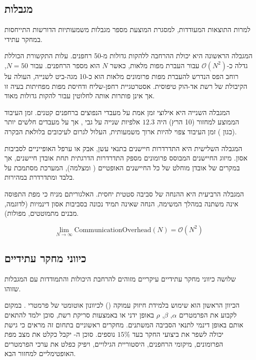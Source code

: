 \subsection{מגבלות}
\label{sec:ch09_limitations}

למרות התוצאות המעודדות, למסגרת המוצעת מספר מגבלות משמעותיות הדורשות התייחסות במחקר עתידי.

המגבלה הראשונה היא יכולת ההרחבה ללהקות גדולות מ-50 רחפנים. עלות התקשורת הכוללת גדלה כ-$\mathcal{O}(N^{2})$ עבור העברת מפות מלאות, כאשר $N$ הוא מספר הרחפנים. עבור $N = 50$, רוחב הפס הנדרש להעברת מפות פרומונים מלאות הוא כ-10 מגה-ביט לשנייה, העולה על הקיבולת של רשת  אד-הוק טיפוסית. אסטרטגיית רחפן-שליח ודחיסת מפות מפחיתות בעיה זו אך אינן פותרות אותה לחלוטין עבור להקות גדולות מאוד.

המגבלה השנייה היא אילוצי זמן אמת על מעבדי  הנפוצים ברחפנים קטנים. זמן העיבוד הממוצע למחזור  (10 הרץ) היה $12.3$ אלפיות שנייה על גבי , אך על מעבדים חלשים יותר (כגון ) זמן העיבוד צפוי להיות ארוך משמעותית, העלול לגרום לעיכובים בלולאת הבקרה.

המגבלה השלישית היא התדרדרות חיישנים בתנאי עשן, אבק או ערפל האופייניים לסביבות אסון. מיזוג החיישנים המבוסס פרומונים מספק התדרדרות הדרגתית תחת אובדן חיישנים, אך במקרים של אובדן מוחלט של כל החיישנים האופטיים ( ומצלמה), המערכת מסתמכת על  בלבד ומתדרדרת במהירות.

המגבלה הרביעית היא ההנחה של סביבה סטטית יחסית. האלגוריתם מניח כי מפת התפוסה אינה משתנה במהלך המשימה, הנחה שאינה תמיד נכונה בסביבות אסון דינמיות (לדוגמה, מבנים מתמוטטים, מפולות).

\begin{equation}
\lim_{N \to \infty} \text{CommunicationOverhead}(N) = \mathcal{O}(N^{2})
\label{eq:ch09_scalability}
\end{equation}

\subsection{כיווני מחקר עתידיים}
\label{sec:ch09_future_work}

שלושה כיווני מחקר עתידיים עיקריים מזוהים להרחבת היכולות והתמודדות עם המגבלות שזוהו.

הכיוון הראשון הוא שימוש בלמידת חיזוק עמוקה () לכיוונון אוטומטי של פרמטרי . במקום לקבוע את הפרמטרים $\alpha$, $\beta$, $\rho$ באופן ידני או באמצעות סריקת רשת, סוכן  ילמד להתאים אותם באופן דינמי לתנאי הסביבה המשתנים. מחקרים ראשוניים בתחום זה \cite{Nedjah2022DRL} מראים כי גישת  יכולה לשפר את ביצועי החקר בעד $15\%$ נוספים. סוכן ה- יקבל כקלט את מצב מפת הפרומונים, מיקומי הרחפנים, היסטוריית הגילויים, ויפיק כפלט את ערכי הפרמטרים האופטימליים למחזור הבא.

